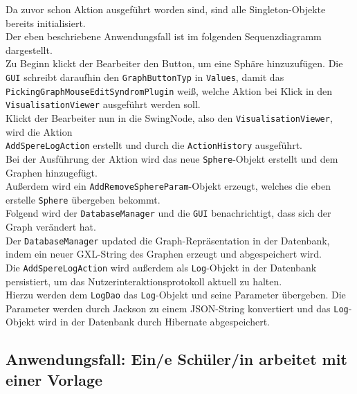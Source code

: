 \documentclass[enabledeprecatedfontcommands,fontsize=11pt,paper=a4,twoside]{scrartcl}
\begin{document}
Da zuvor schon Aktion ausgeführt worden sind, sind alle Singleton-Objekte bereits initialisiert. \\
Der eben beschriebene Anwendungsfall ist im folgenden Sequenzdiagramm dargestellt. \\
Zu Beginn klickt der Bearbeiter den Button, um eine Sphäre hinzuzufügen. Die \texttt{GUI} schreibt daraufhin den \texttt{GraphButtonTyp} in \texttt{Values}, damit das \texttt{PickingGraphMouseEditSyndromPlugin} weiß, welche Aktion bei Klick in den \texttt{VisualisationViewer} ausgeführt werden soll. \\
Klickt der Bearbeiter nun in die SwingNode, also den  \texttt{VisualisationViewer}, wird die Aktion\\ \texttt{AddSpereLogAction} erstellt und durch die \texttt{ActionHistory} ausgeführt. \\
Bei der Ausführung der Aktion wird das neue \texttt{Sphere}-Objekt erstellt und dem Graphen hinzugefügt. \\
Außerdem wird ein \texttt{AddRemoveSphereParam}-Objekt erzeugt, welches die eben erstelle \texttt{Sphere} übergeben bekommt. \\
Folgend wird der \texttt{DatabaseManager} und die \texttt{GUI} benachrichtigt, dass sich der Graph verändert hat. \\
Der \texttt{DatabaseManager} updated die Graph-Repräsentation in der Datenbank, indem ein neuer GXL-String des Graphen erzeugt und abgespeichert wird.\\
Die \texttt{AddSpereLogAction} wird außerdem als \texttt{Log}-Objekt in der Datenbank persistiert, um das Nutzerinteraktionsprotokoll aktuell zu halten. \\
Hierzu werden dem \texttt{LogDao} das \texttt{Log}-Objekt und seine Parameter übergeben. Die Parameter werden durch Jackson zu einem JSON-String konvertiert und das \texttt{Log}-Objekt wird in der Datenbank durch Hibernate abgespeichert.










\newpage

\subsection{Anwendungsfall: Ein/e Schüler/in arbeitet mit einer Vorlage}
\end{document}
